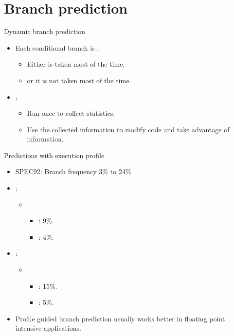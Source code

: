 \section{Branch prediction}

\begin{frame}[t]{Dynamic branch prediction}
\begin{itemize}
  \item Each conditional branch is .
    \begin{itemize}
      \item Either is taken most of the time,
      \item or it is not taken most of the time.
    \end{itemize}

  \item {}:
    \begin{itemize}
      \item Run once to collect statistics.
      \item Use the collected information to modify code and take advantage of information.
    \end{itemize}
\end{itemize}
\end{frame}

\begin{frame}[t]{Predictions with execution profile}
\begin{itemize}
  \item SPEC92: Branch frequency 3\% to 24\%

  \item {}:
    \begin{itemize}
      \item {}. 
        \begin{itemize}
          \item {}: 9\%. 
          \item {}: 4\%.
        \end{itemize}
    \end{itemize}

  \item {}:
    \begin{itemize}
      \item {}. 
        \begin{itemize}
          \item {}: 15\%. 
          \item {}: 5\%.
        \end{itemize}
    \end{itemize}

  \item Profile guided branch prediction usually works better
        in floating point intensive applications.
\end{itemize}
\end{frame}


